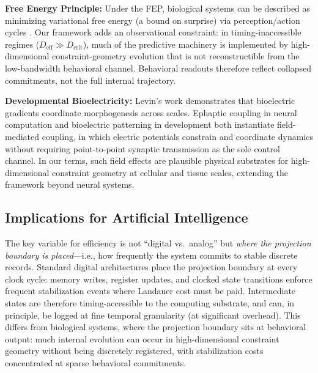 \documentclass[12pt]{article}
\begin{document}
\textbf{Free Energy Principle:} Under the FEP, biological systems can be described as minimizing variational free energy (a bound on surprise) via perception/action cycles \cite{friston2010}. Our framework adds an observational constraint: in timing-inaccessible regimes ($D_{\text{eff}} \gg D_{\text{crit}}$), much of the predictive machinery is implemented by high-dimensional constraint-geometry evolution that is not reconstructible from the low-bandwidth behavioral channel. Behavioral readouts therefore reflect collapsed commitments, not the full internal trajectory.

\textbf{Developmental Bioelectricity:} Levin's work demonstrates that bioelectric gradients coordinate morphogenesis across scales. Ephaptic coupling in neural computation and bioelectric patterning in development both instantiate field-mediated coupling, in which electric potentials constrain and coordinate dynamics without requiring point-to-point synaptic transmission as the sole control channel. In our terms, such field effects are plausible physical substrates for high-dimensional constraint geometry at cellular and tissue scales, extending the framework beyond neural systems.

\subsection{Implications for Artificial Intelligence}

The key variable for efficiency is not ``digital vs.\ analog'' but \textit{where the projection boundary is placed}---i.e., how frequently the system commits to stable discrete records. Standard digital architectures place the projection boundary at every clock cycle: memory writes, register updates, and clocked state transitions enforce frequent stabilization events where Landauer cost must be paid. Intermediate states are therefore timing-accessible to the computing substrate, and can, in principle, be logged at fine temporal granularity (at significant overhead). This differs from biological systems, where the projection boundary sits at behavioral output: much internal evolution can occur in high-dimensional constraint geometry without being discretely registered, with stabilization costs concentrated at sparse behavioral commitments.
\end{document}
